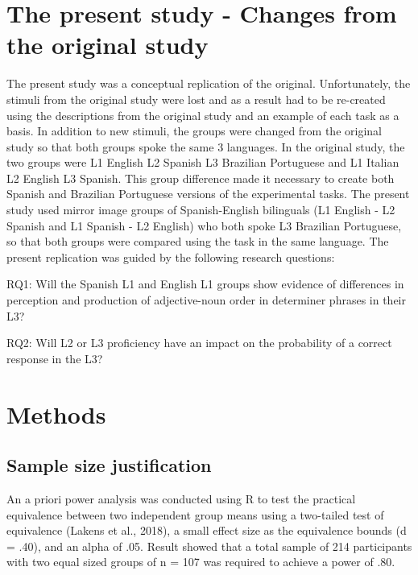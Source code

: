 \documentclass[
  man]{apa6}
\begin{document}
\hypertarget{the-present-study---changes-from-the-original-study}{%
\section{The present study - Changes from the original study}\label{the-present-study---changes-from-the-original-study}}

The present study was a conceptual replication of the original.
Unfortunately, the stimuli from the original study were lost and as a result had to be re-created using the descriptions from the original study and an example of each task as a basis.
In addition to new stimuli, the groups were changed from the original study so that both groups spoke the same 3 languages.
In the original study, the two groups were L1 English L2 Spanish L3 Brazilian Portuguese and L1 Italian L2 English L3 Spanish.
This group difference made it necessary to create both Spanish and Brazilian Portuguese versions of the experimental tasks.
The present study used mirror image groups of Spanish-English bilinguals (L1 English - L2 Spanish and L1 Spanish - L2 English) who both spoke L3 Brazilian Portuguese, so that both groups were compared using the task in the same language.
The present replication was guided by the following research questions:

RQ1: Will the Spanish L1 and English L1 groups show evidence of differences in perception and production of adjective-noun order in determiner phrases in their L3?

RQ2: Will L2 or L3 proficiency have an impact on the probability of a correct response in the L3?

\hypertarget{methods}{%
\section{Methods}\label{methods}}

\hypertarget{sample-size-justification}{%
\subsection{Sample size justification}\label{sample-size-justification}}

An a priori power analysis was conducted using R to test the practical equivalence between two independent group means using a two-tailed test of equivalence (Lakens et al., 2018), a small effect size as the equivalence bounds (d = .40), and an alpha of .05.
Result showed that a total sample of 214 participants with two equal sized groups of n = 107 was required to achieve a power of .80.
\end{document}

